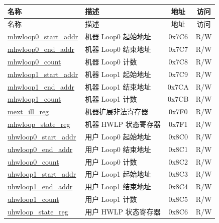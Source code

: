 \begin{longtable}{ | p{4.0cm} | p{8.4cm} | c | c| }
\hline\rowcolor{lightgray}
名称 & 描述 & 地址 & 访问 \\ \hline
\endfirsthead
\hline
\rowcolor{lightgray}
名称 & 描述 & 地址 & 访问\\
\hline
\endhead
\endfoot
\hyperref[sec:riscvcpu-hwloop-reg-desc]{mhwloop0\_start\_addr} & 机器 Loop0 起始地址 & 0x7C6 & R/W \\\hline
\hyperref[sec:riscvcpu-hwloop-reg-desc]{mhwloop0\_end\_addr} & 机器 Loop0 结束地址 & 0x7C7 & R/W \\\hline
\hyperref[sec:riscvcpu-hwloop-reg-desc]{mhwloop0\_count} & 机器 Loop0 计数 & 0x7C8 & R/W \\\hline
\hyperref[sec:riscvcpu-hwloop-reg-desc]{mhwloop1\_start\_addr} & 机器 Loop1 起始地址 & 0x7C9 & R/W \\\hline
\hyperref[sec:riscvcpu-hwloop-reg-desc]{mhwloop1\_end\_addr} & 机器 Loop1 结束地址 & 0x7CA & R/W \\\hline
\hyperref[sec:riscvcpu-hwloop-reg-desc]{mhwloop1\_count} & 机器 Loop1 计数 & 0x7CB & R/W \\\hline
\hyperref[sec:riscvcpu-hwloop-reg-desc]{mext\_ill\_reg} & 机器扩展非法寄存器 & 0x7F0 & R/W \\\hline
\hyperref[sec:riscvcpu-hwloop-reg-desc]{mhwloop\_state\_reg} & 机器 HWLP 状态寄存器 & 0x7F1 & R/W \\\hline
\hyperref[sec:riscvcpu-hwloop-reg-desc]{uhwloop0\_start\_addr} & 用户 Loop0 起始地址 & 0x8C0 & R/W \\\hline
\hyperref[sec:riscvcpu-hwloop-reg-desc]{uhwloop0\_end\_addr} & 用户 Loop0 结束地址 & 0x8C1 & R/W \\\hline
\hyperref[sec:riscvcpu-hwloop-reg-desc]{uhwloop0\_count} & 用户 Loop0 计数 & 0x8C2 & R/W \\\hline
\hyperref[sec:riscvcpu-hwloop-reg-desc]{uhwloop1\_start\_addr} & 用户 Loop1 起始地址 & 0x8C3 & R/W \\\hline
\hyperref[sec:riscvcpu-hwloop-reg-desc]{uhwloop1\_end\_addr} & 用户 Loop1 结束地址 & 0x8C4 & R/W \\\hline
\hyperref[sec:riscvcpu-hwloop-reg-desc]{uhwloop1\_count} & 用户 Loop1 计数 & 0x8C5 & R/W \\\hline
\hyperref[sec:riscvcpu-hwloop-reg-desc]{uhwloop\_state\_reg} & 用户 HWLP 状态寄存器 & 0x8C6 & R/W \\\hline
\end{longtable}
